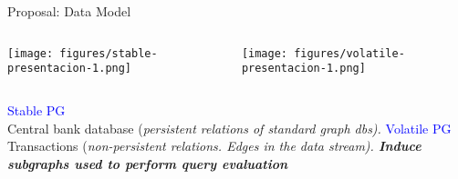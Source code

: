 \begin{frame}{Proposal: Data Model}
    \begin{columns}
        \begin{center}
            \texttt{[image: figures/stable-presentacion-1.png]}  
        \end{center}

        \begin{center} 
            \texttt{[image: figures/volatile-presentacion-1.png]}
        \end{center}
    \end{columns}
    \vspace{0.6em}
    \begin{columns}
        \hspace{4.7em}\textcolor{blue}{Stable PG} \\Central bank database 
        {\small(\emph{persistent relations of standard graph dbs).}}
        \hspace{4.7em}
        \textcolor{blue}{Volatile PG} \\
        \vspace{0.3em}
        Transactions 
        {\small(\emph{non-persistent relations. Edges in the data stream).
        \textbf{Induce subgraphs used to perform query evaluation}}}
    \end{columns}
    
\end{frame}


